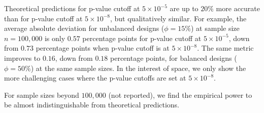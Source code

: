 Theoretical predictions for p-value cutoff at $5\times 10^{-5}$ are up to $20\%$ more accurate than for p-value cutoff at $5\times 10^{-8}$, but qualitatively similar.
For example, the average absolute deviation for unbalanced designs ($\phi=15\%$) at sample size $n=100,000$ is only $0.57$ percentage points for p-value cutoff at $5\times 10^{-5}$, down from $0.73$ percentage points when p-value cutoff is at $5\times 10^{-8}$.
The same metric improves to $0.16$, down from $0.18$ percentage points, for balanced designs ($\phi=50\%$) at the same sample sizes.
In the interest of space, we only show the more challenging cases where the p-value cutoffs are set at $5\times 10^{-8}$.

For sample sizes beyond $100,000$ (not reported), we find the empirical power to be almost indistinguishable from theoretical predictions.

